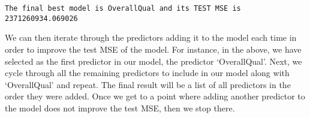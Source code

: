 \documentclass[11pt]{article}
\begin{document}
    \begin{Verbatim}[commandchars=\\\{\}]
The final best model is OverallQual and its TEST MSE is 2371260934.069026

    \end{Verbatim}

    We can then iterate through the predictors adding it to the model each
time in order to improve the test MSE of the model. For instance, in the
above, we have selected as the first predictor in our model, the
predictor `OverallQual'. Next, we cycle through all the remaining
predictors to include in our model along with `OverallQual' and repeat.
The final result will be a list of all predictors in the order they were
added. Once we get to a point where adding another predictor to the
model does not improve the test MSE, then we stop there.
\end{document}
